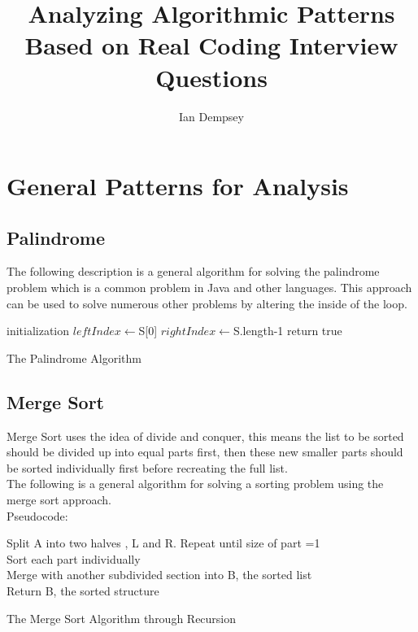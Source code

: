 \documentclass[twocolumn]{article}
\title{Analyzing Algorithmic Patterns Based on Real Coding Interview Questions}
\author{Ian Dempsey}
\begin{document}
\maketitle
{}
\newpage
{}

\section{General Patterns for Analysis}
\subsection{Palindrome}
The following description is a general algorithm for solving the palindrome problem which is a common problem in Java and other languages. This approach can be used to solve numerous other problems by altering the inside of the loop.
\IncMargin{1em}
\begin{algorithm}
	\SetAlgoLined
	initialization\;
	$leftIndex  \longleftarrow $S[0]\;
	$rightIndex \longleftarrow $S.length-1\;
return true\;
\caption{The Palindrome Algorithm}
\end{algorithm}\DecMargin{1em}
\subsection{Merge Sort}
Merge Sort uses the idea of divide and conquer, this means the list to be sorted should be divided up into equal parts first, then these new smaller parts should be sorted individually first before recreating the full list.\\
The following is a general algorithm for solving a sorting problem using the merge sort approach. \\
Pseudocode:
\IncMargin{1em}
\begin{algorithm}
	\SetAlgoLined
  	{Split A into two halves , L and R. Repeat until size of part =1\\
  	Sort each part individually \\
  	Merge with another subdivided section into B, the sorted list\\ 
  	Return B, the sorted structure}
\caption{The Merge Sort Algorithm through Recursion}
\end{algorithm}\DecMargin{1em}
\end{document}
